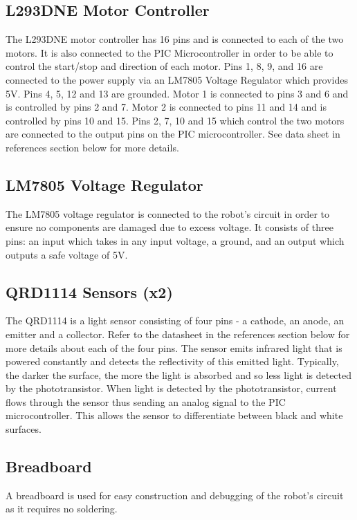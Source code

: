 \documentclass[12pt]{article}
\begin{document}
\subsection{L293DNE Motor Controller}
The L293DNE motor controller has 16 pins and is connected to each of the two motors. It is also connected to the PIC Microcontroller in order to be able to control the start/stop and direction of each motor. Pins 1, 8, 9, and 16 are connected to the power supply via an LM7805 Voltage Regulator which provides 5V. Pins 4, 5, 12 and 13 are grounded. Motor 1 is connected to pins 3 and 6 and is controlled by pins 2 and 7. Motor 2 is connected to pins 11 and 14 and is controlled by pins 10 and 15. Pins 2, 7, 10 and 15 which control the two motors are connected to the output pins on the PIC microcontroller. See data sheet in references section below for more details.

\subsection{LM7805 Voltage Regulator}
The LM7805 voltage regulator is connected to the robot’s circuit in order to ensure no components are damaged due to excess voltage. It consists of three pins: an input which takes in any input voltage, a ground, and an output which outputs a safe voltage of 5V.

\subsection{QRD1114 Sensors (x2)}
The QRD1114 is a light sensor consisting of four pins - a cathode, an anode, an emitter and a collector. Refer to the datasheet in the references section below for more details about each of the four pins. The sensor emits infrared light that is powered constantly and detects the reflectivity of this emitted light. Typically, the darker the surface, the more the light is absorbed and so less light is detected by the phototransistor. When light is detected by the phototransistor, current flows through the sensor thus sending an analog signal to the PIC microcontroller. This allows the sensor to differentiate between black and white surfaces.

\subsection{Breadboard}
A breadboard is used for easy construction and debugging of the robot’s circuit as it requires no soldering.
\end{document}
